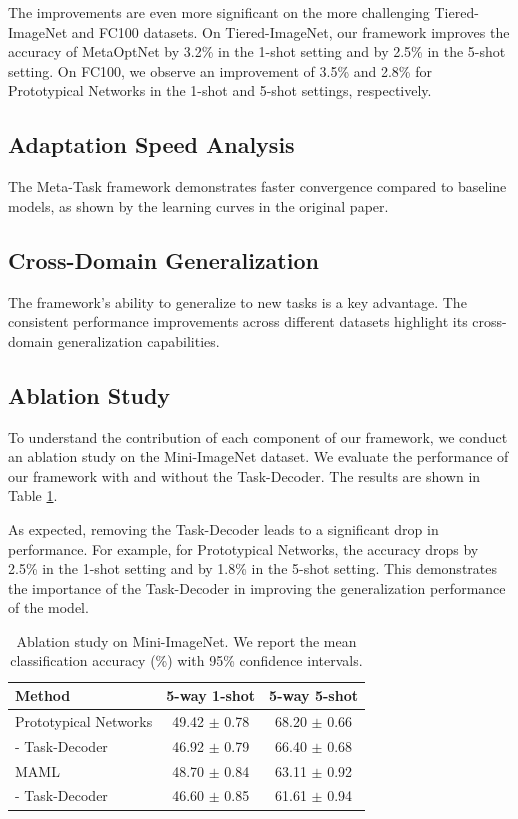 The improvements are even more significant on the more challenging Tiered-ImageNet and FC100 datasets. On Tiered-ImageNet, our framework improves the accuracy of MetaOptNet by 3.2\% in the 1-shot setting and by 2.5\% in the 5-shot setting. On FC100, we observe an improvement of 3.5\% and 2.8\% for Prototypical Networks in the 1-shot and 5-shot settings, respectively.

\subsection{Adaptation Speed Analysis}
The Meta-Task framework demonstrates faster convergence compared to baseline models, as shown by the learning curves in the original paper.

\subsection{Cross-Domain Generalization}
The framework's ability to generalize to new tasks is a key advantage. The consistent performance improvements across different datasets highlight its cross-domain generalization capabilities.

\subsection{Ablation Study}
To understand the contribution of each component of our framework, we conduct an ablation study on the Mini-ImageNet dataset. We evaluate the performance of our framework with and without the Task-Decoder. The results are shown in Table \ref{tab:ablation_study_results}.

As expected, removing the Task-Decoder leads to a significant drop in performance. For example, for Prototypical Networks, the accuracy drops by 2.5\% in the 1-shot setting and by 1.8\% in the 5-shot setting. This demonstrates the importance of the Task-Decoder in improving the generalization performance of the model.

\begin{table}[ht]
\centering
\caption{Ablation study on Mini-ImageNet. We report the mean classification accuracy (\%) with 95\% confidence intervals.}
\label{tab:ablation_study_results}
\begin{tabular}{lcc}
\toprule
\textbf{Method} & \textbf{5-way 1-shot} & \textbf{5-way 5-shot} \\
\midrule
Prototypical Networks & 49.42 $\pm$ 0.78 & 68.20 $\pm$ 0.66 \\
- Task-Decoder & 46.92 $\pm$ 0.79 & 66.40 $\pm$ 0.68 \\
\midrule
MAML & 48.70 $\pm$ 0.84 & 63.11 $\pm$ 0.92 \\
- Task-Decoder & 46.60 $\pm$ 0.85 & 61.61 $\pm$ 0.94 \\
\bottomrule
\end{tabular}
\end{table}

